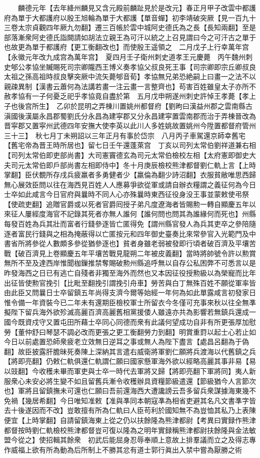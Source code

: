 　　麟德元年【去年絳州麟見又含元殿前麟趾見於是改元】春正月甲子改雲中都護府為單于大都護府以殷王旭輪為單于大都護【單音蟬】初李靖破突厥【見一百九十三卷太宗貞觀四年厥九勿翻】遷三百帳於雲中城阿史德氏為之長【長知兩翻】至是部落漸衆阿史德氏詣闕請如胡法立親王為可汗以統之上召見謂曰今之可汗古之單于也故更為單于都護府【更工衡翻改也】而使殷王遥領之　二月戊子上行幸萬年宫【永徽元年改九成宫為萬年宫】　夏四月壬子衛州刺史道孝王元慶薨　丙午魏州刺史郇公孝協坐贓賜死司宗卿隴西王博义奏孝協父叔良死王事【司宗卿即宗丘卿叔良太祖之孫高祖時叔良擊突厥中流矢薨郇音荀】孝協無兄弟恐絶嗣上曰畫一之法不以親疎異制【漢書云蕭何為法講若畫一注云畫一言整齊也】苟害百姓雖皇太子亦所不赦孝協有一子何憂乏祀乎孝協竟自盡於第　五月戊申朔遂州刺史許悼王孝薨【孝上子也後宫所生】　乙卯於昆明之弄棟川置姚州都督府【劉昫曰漢益州郡之雲南縣古滇國後漢屬永昌郡蜀劉氏分永昌為建寜郡又分永昌建寜置雲南郡而治于弄棟晉改為晋寜郡又置寜州武德四年安撫大使李英以此川人多姓姚故置姚州今陞置都督府管州三十三】　秋七月丁未朔詔以三年正月有事於岱宗　八月丙子車駕還京師幸舊宅【舊宅帝為晋王時所居也】留七日壬午還蓬萊宫　丁亥以司列太常伯劉祥道兼右相【司列太常伯即吏部尚書】大司憲竇德玄為司元太常伯檢校左相【太府憲即御史大夫司元太常伯即戶部尚書左相即侍中】冬十月庚辰檢校熊津都督劉仁軌上言【上時掌翻】臣伏覩所存戌兵疲羸者多勇健者少【羸倫為翻少詩沼翻】衣服貧敝唯思西歸無心展效臣問以往在海西見百姓人人應募爭欲從軍或請自辦衣糧謂之義征何為今日士卒如此咸言今日官府與曩時不同人心亦殊曩時東西征役身没王事並蒙敕使弔祭【使疏吏翻】追贈官爵或以死者官爵囘授子弟凡度遼海者皆賜勲一轉自顯慶五年以來征人屢經度海官不記錄其死者亦無人誰何【誰何問也問其為誰緣何而死也】州縣每發百姓為兵其壯而富者行錢參逐皆亡匿得免【謂州縣官發人為兵其吏卒之參陪隨逐者富民行錢與之相為掩蔽得以亡匿按元和四年御史臺奏比來常參官入光範門及中書省所將參從人數頗多參從猶參逐也】貧者身雖老弱被發即行頃者破百濟及平壤苦戰【破百濟見上卷顯慶五年平壤苦戰見龍朔二年被皮義翻】當時將帥號令許以勲賞無所不至及達西岸惟聞枷鏁推禁奪賜破勲州縣追呼無以自存公私困弊不可悉言以是昨發海西之日已有逃亡自殘者非獨至海外而然也又本因征役授勲級以為榮寵而比年出征皆使勲官挽引【比毗至翻挽引謂挽引舟車】勞苦與白丁無殊百姓不願從軍率皆由此臣又問曩日士卒留鎮五年尚得支濟今爾等始經一年何為如此單露咸言初發家日惟令備一年資裝今已二年未有還期臣檢校軍士所留衣今冬僅可充事來秋以往全無凖擬陛下留兵海外欲殄滅高麗百濟高麗舊相黨援倭人雖遠亦共為影響若無鎮兵還成一國今既資戍守又置屯田所藉士卒同心同德而衆有此議何望成功自非有所更張厚加慰勞【董仲舒曰琴瑟不調必改而更張之更工衡翻勞力到翻】明賞重罸以起士心若止如今日以前處置恐師衆疲老立效無日逆耳之事或無人為陛下盡言【處昌呂翻為于偽翻】故臣披露肝膽昧死奏陳上深納其言遣右威衛將軍劉仁願將兵渡海以代舊鎮之兵【將即亮翻】仍敕仁軌俱還仁軌謂仁願曰國家懸軍海外欲以經略高麗其事非易【易以豉翻】今收穫未畢而軍吏與士卒一時代去軍將又歸【將即亮翻下軍將同】夷人新服衆心未安必將生變不如且留舊兵漸令收穫辦具資糧節級遣還【節級猶今人言節次也】軍將且留鎮撫未可還也仁願曰吾前還海西大遭讒謗云吾多留兵衆謀據海東幾不免禍【幾居希翻】今日唯知准敕【准與凖同本朝寇凖為相省吏避其名凡文書準字皆去十後遂因而不改】豈敢擅有所為仁軌曰人臣苟利於國知無不為豈恤其私乃上表陳便宜【上時掌翻】自請留鎮海東上從之仍以扶餘隆為熊津都尉【考異曰實録作熊津都督按時劉仁軌檢校熊津都督豈可復以隆為之明年實録稱熊津都尉扶餘隆與金法敏盟今從之】使招輯其餘衆　初武后能屈身忍辱奉順上意故上排羣議而立之及得志專作威福上欲有所為動為后所制上不勝其忿有道士郭行眞出入禁中嘗為厭勝之術